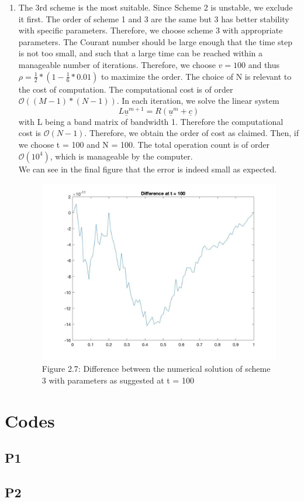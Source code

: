\documentclass[a4paper,11pt]{article}
\begin{document}
\begin{enumerate}[label = (\roman*)]
\item
The 3rd scheme is the most suitable. Since Scheme 2 is unstable, we exclude it first. The order of scheme 1 and 3 are the same but 3 has better stability with specific parameters. Therefore, we choose scheme 3 with appropriate parameters. The Courant number should be large enough that the time step is not too small, and such that a large time can be reached within a manageable number of iterations. Therefore, we choose $v = 100$ and thus $\rho = \frac{1}{2}*(1-\frac{1}{6}*0.01)$ to maximize the order. 
The choice of N is relevant to the cost of computation. The computational cost is of order $\mathcal{O}((M-1)*(N-1))$. In each iteration, we solve the linear system $$L\underline{u}^{m+1}=R(\underline{u}^m+\underline{c})$$ with L being a band matrix of bandwidth 1. Therefore the computational cost is $\mathcal{O}(N-1)$. Therefore, we obtain the order of cost as claimed.
Then, if we choose t = 100 and N = 100. The total operation count is of order $\mathcal{O}(10^4)$, which is manageable by the computer. \\
We can see in the final figure that the error is indeed small as expected.
\begin{figure}[H]
\center
\includegraphics[width = 0.9\linewidth, height =8cm]{last.jpg}
\caption{Figure 2.7: Difference between the numerical solution of scheme 3 with parameters as suggested at t = 100}
\end{figure}
\end{enumerate}
\appendix
\section{Codes}
\subsection{P1}
\label{P1}

\newpage
\subsection{P2}
\label{P2}

\end{document}
